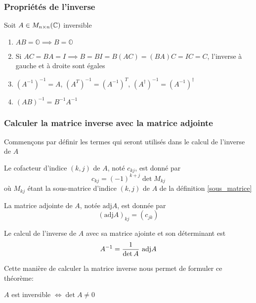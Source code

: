 \subsubsection{Propriétés de l'inverse}
Soit $A \in M_{n \times n}(\mathbb{C})$ inversible \begin{enumerate}
    \item $AB = \mathbb{O} \implies B = \mathbb{O}$
    \item Si $AC = BA = I \implies B = BI = B(AC) = (BA)C = IC = C $, l'inverse à gauche et à droite sont égales
    \item $(A^{-1})^{-1} = A$, \quad $(A^T)^{-1} = (A^{-1})^{T}$, \quad $(A^\dagger)^{-1} = (A^{-1})^{\dagger}$
    \item $(AB)^{-1} = B^{-1}A^{-1}$
\end{enumerate}

\subsubsection{Calculer la matrice inverse avec la matrice adjointe}
Commençons par définir les termes qui seront utilisés dans le calcul de l'inverse de $A$
\begin{definition}
     Le cofacteur d'indice $(k, j)$ de $A$, noté $c_{kj}$, est donné par
    \[ c_{kj} = (-1)^{k + j}\det M_{kj} \]    
    où $M_{kj}$ étant la sous-matrice d'indice $(k, j)$ de $A$ de la définition \ref{sous_matrice}
\end{definition}
\begin{definition}
     La matrice adjointe de $A$, notée $\text{adj} A$, est donnée par
\[ \left(\text{adj} A\right)_{kj} = \left( c_{jk} \right) \]
\end{definition}
\begin{theorem}
    Le calcul de l'inverse de $A$ avec sa matrice ajointe et son déterminant est
    \[ A^{-1} = \frac{1}{\det A} \ \textup{adj}A \]
\end{theorem}
Cette manière de calculer la matrice inverse nous permet de formuler ce théorème:
\begin{theorem}
    \label{inversible_small}
    $A$ est inversible $\iff \det A \neq 0$
\end{theorem}

